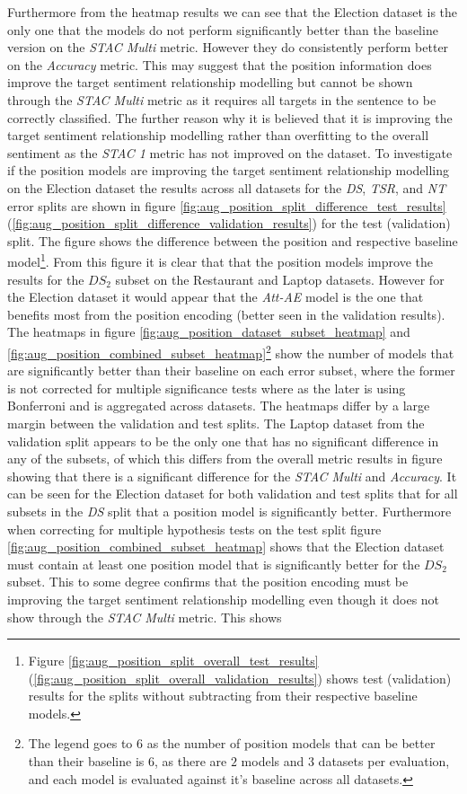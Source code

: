 Furthermore from the heatmap results we can see that the Election dataset is the only one that the models do not perform significantly better than the baseline version on the \textit{STAC Multi} metric. However they do consistently perform better on the \textit{Accuracy} metric. This may suggest that the position information does improve the target sentiment relationship modelling but cannot be shown through the \textit{STAC Multi} metric as it requires all targets in the sentence to be correctly classified. The further reason why it is believed that it is improving the target sentiment relationship modelling rather than overfitting to the overall sentiment as the \textit{STAC 1} metric has not improved on the dataset. To investigate if the position models are improving the target sentiment relationship modelling on the Election dataset the results across all datasets for the \textit{DS}, \textit{TSR}, and \textit{NT} error splits are shown in figure \ref{fig:aug_position_split_difference_test_results} (\ref{fig:aug_position_split_difference_validation_results}) for the test (validation) split. The figure shows the difference between the position and respective baseline model\footnote{Figure \ref{fig:aug_position_split_overall_test_results} (\ref{fig:aug_position_split_overall_validation_results}) shows test (validation) results for the splits without subtracting from their respective baseline models.}. From this figure it is clear that that the position models improve the results for the $DS_2$ subset on the Restaurant and Laptop datasets. However for the Election dataset it would appear that the \textit{Att-AE} model is the one that benefits most from the position encoding (better seen in the validation results). The heatmaps in figure \ref{fig:aug_position_dataset_subset_heatmap} and \ref{fig:aug_position_combined_subset_heatmap}\footnote{The legend goes to $6$ as the number of position models that can be better than their baseline is $6$, as there are $2$ models and $3$ datasets per evaluation, and each model is evaluated against it's baseline across all datasets.} show the number of models that are significantly better than their baseline on each error subset, where the former is not corrected for multiple significance tests where as the later is using Bonferroni and is aggregated across datasets. The heatmaps differ by a large margin between the validation and test splits. The Laptop dataset from the validation split appears to be the only one that has no significant difference in any of the subsets, of which this differs from the overall metric results in figure showing that there is a significant difference for the \textit{STAC Multi} and \textit{Accuracy}. It can be seen for the Election dataset for both validation and test splits that for all subsets in the \textit{DS} split that a position model is significantly better. Furthermore when correcting for multiple hypothesis tests on the test split figure \ref{fig:aug_position_combined_subset_heatmap} shows that the Election dataset must contain at least one position model that is significantly better for the $DS_2$ subset. This to some degree confirms that the position encoding must be improving the target sentiment relationship modelling even though it does not show through the \textit{STAC Multi} metric. This shows 